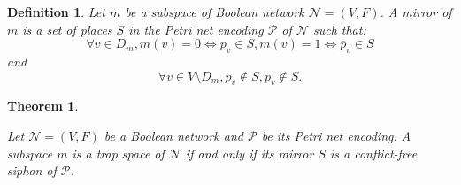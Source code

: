 \documentclass[preprint,12pt]{elsarticle}
\newtheorem{theorem}{Theorem}[section]
\newtheorem{definition}{Definition}[section]
\begin{document}
\begin{definition}

  Let \(m\) be a subspace of Boolean network \(\mathcal{N} = (V, F)\). 
  A \emph{mirror} of \(m\) is a set of places \(S\) in the Petri net encoding \(\mathcal{P}\) of \(\mathcal{N}\) such that:
  \[\forall v \in D_m, m(v) = 0 \Leftrightarrow p_v \in S, m(v) = 1 \Leftrightarrow \overline{p}_v \in S\] and \[\forall v \in V \setminus D_m, p_v \not \in S, \overline{p}_v \not \in S.\]

\end{definition}

\begin{theorem}%
\label{theo:ts_2_sp}

  Let \(\mathcal{N} = (V, F)\) be a Boolean network and \(\mathcal{P}\) be its Petri net encoding. A subspace \(m\) is a trap space of \(\mathcal{N}\) if and only if its mirror \(S\) is a conflict-free siphon of \(\mathcal{P}\).

\end{theorem}
\end{document}
